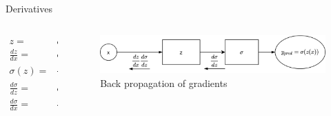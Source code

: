 \begin{frame}[allowframebreaks]{Derivatives}
	\framebreak
	
	\begin{columns}
		\begin{column}{.5\textwidth}
			\begin{align}
				z=&ax+b \\
				\frac{dz}{dx} =& a \\
				\sigma(z) =&\frac{1}{e^{-z}+1} \\
				\frac{d\sigma}{dz} =& \sigma(z)(1-\sigma(z)) \\
				\frac{d\sigma}{dx}=&\frac{d\sigma}{dz} \frac{dz}{dx}=\frac{dz}{dx} \frac{d\sigma}{dz}  
			\end{align}
		\end{column}
		\begin{column}{.5\textwidth}
			\begin{figure}
				\includegraphics[width=.8\textwidth, center]{figures/function_composition_sigma}
				\caption*{Back propagation of gradients}
			\end{figure}
		\end{column}
	\end{columns}
\end{frame}